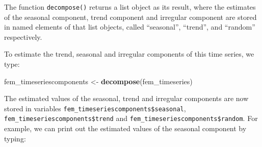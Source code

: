 \documentclass[]{book}
\newenvironment{Shaded}{\begin{snugshade}}{\end{snugshade}}
\newcommand{\KeywordTok}[1]{\textcolor[rgb]{0.13,0.29,0.53}{\textbf{#1}}}
\newcommand{\NormalTok}[1]{#1}
\newcommand{\OperatorTok}[1]{\textcolor[rgb]{0.81,0.36,0.00}{\textbf{#1}}}
\newcommand{\StringTok}[1]{\textcolor[rgb]{0.31,0.60,0.02}{#1}}
\begin{document}
The function \texttt{decompose()} returns a list object as its result, where the estimates of the seasonal component, trend component and irregular component are stored in named elements of that list objects, called ``seasonal'', ``trend'', and ``random'' respectively.

To estimate the trend, seasonal and irregular components of this time series, we type:

\begin{Shaded}
\begin{Highlighting}[]
\NormalTok{fem_timeseriescomponents <-}\StringTok{ }\KeywordTok{decompose}\NormalTok{(fem_timeseries)}
\end{Highlighting}
\end{Shaded}

The estimated values of the seasonal, trend and irregular components are now stored in variables \texttt{fem\_timeseriescomponents\$seasonal}, \texttt{fem\_timeseriescomponents\$trend} and \texttt{fem\_timeseriescomponents\$random}. For example, we can print out the estimated values of the seasonal component by typing:

\begin{Shaded}
\end{Shaded}
\end{document}
